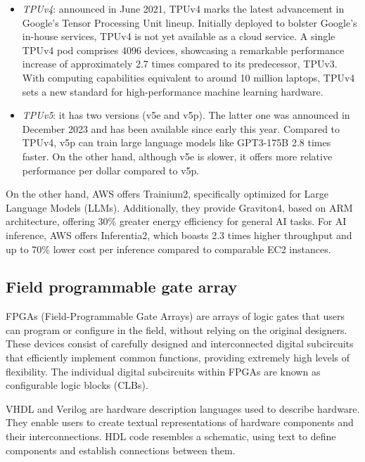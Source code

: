 \begin{itemize}
    \item \textit{TPUv4}: announced in June 2021, TPUv4 marks the latest advancement in Google's Tensor Processing Unit lineup. 
        Initially deployed to bolster Google's in-house services, TPUv4 is not yet available as a cloud service.
        A single TPUv4 pod comprises 4096 devices, showcasing a remarkable performance increase of approximately 2.7 times compared to its predecessor, TPUv3. 
        With computing capabilities equivalent to around 10 million laptops, TPUv4 sets a new standard for high-performance machine learning hardware.
    \item \textit{TPUv5}: it has two versions (v5e and v5p). 
        The latter one was announced in December 2023 and has been available since early this year.
        Compared to TPUv4, v5p can train large language models like GPT3-175B 2.8 times faster.
        On the other hand, although v5e is slower, it offers more relative performance per dollar compared to v5p.
\end{itemize}
On the other hand, AWS offers Trainium2, specifically optimized for Large Language Models (LLMs). 
Additionally, they provide Graviton4, based on ARM architecture, offering 30\% greater energy efficiency for general AI tasks. 
For AI inference, AWS offers Inferentia2, which boasts 2.3 times higher throughput and up to 70\% lower cost per inference compared to comparable EC2 instances.

\subsection{Field programmable gate array}
FPGAs (Field-Programmable Gate Arrays) are arrays of logic gates that users can program or configure in the field, without relying on the original designers.
These devices consist of carefully designed and interconnected digital subcircuits that efficiently implement common functions, providing extremely high levels of flexibility. 
The individual digital subcircuits within FPGAs are known as configurable logic blocks (CLBs).

VHDL and Verilog are hardware description languages used to describe hardware. 
They enable users to create textual representations of hardware components and their interconnections. 
HDL code resembles a schematic, using text to define components and establish connections between them.

